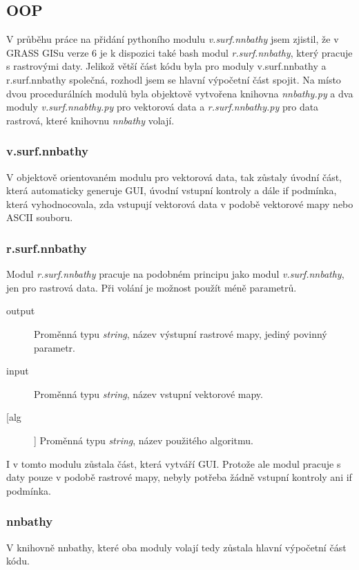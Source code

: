\documentclass[12pt,a4paper]{article}
\begin{document}
\newpage
\subsection{OOP}
V průběhu práce na přidání pythoního modulu \emph{v.surf.nnbathy} jsem zjistil, že v GRASS GISu verze 6 je k dispozici také bash modul \emph{r.surf.nnbathy}, který pracuje s rastrovými daty. Jelikož větší část kódu byla pro moduly v.surf.nnbathy a r.surf.nnbathy společná, rozhodl jsem se hlavní výpočetní část spojit. Na místo dvou procedurálních modulů byla objektově vytvořena knihovna \emph{nnbathy.py} a dva moduly \emph{v.surf.nnabthy.py} pro vektorová data a \emph{r.surf.nnbathy.py} pro data rastrová, které knihovnu \emph{nnbathy} volají.

\subsubsection{v.surf.nnbathy}
V objektově orientovaném modulu pro vektorová data, tak zůstaly úvodní část, která automaticky generuje GUI, úvodní vstupní kontroly a dále if podmínka, která vyhodnocovala, zda vstupují vektorová data v podobě vektorové mapy nebo ASCII souboru.



\subsubsection{r.surf.nnbathy}
Modul \emph{r.surf.nnbathy} pracuje na podobném principu jako modul \emph{v.surf.nnbathy}, jen pro rastrová data. Při volání je možnost použít méně parametrů.
\begin{description}
\item[output] Proměnná typu \emph{string}, název výstupní rastrové mapy, jediný povinný parametr.
\item[input] Proměnná typu \emph{string}, název vstupní vektorové mapy.
\item[[alg]] Proměnná typu \emph{string}, název použitého algoritmu.
\end{description}


I v tomto modulu zůstala část, která vytváří GUI. Protože ale modul pracuje s daty pouze v podobě rastrové mapy, nebyly potřeba žádně vstupní kontroly ani if podmínka.

\newpage
\subsubsection{nnbathy}
V knihovně nnbathy, které oba moduly volají tedy zůstala hlavní výpočetní část kódu. 
\end{document}
